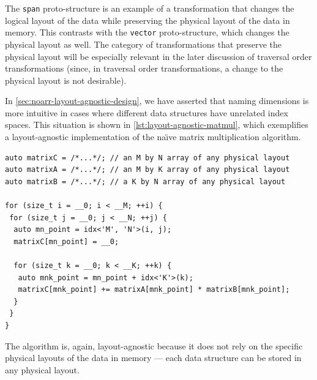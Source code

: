 The \lstinline{span} proto-structure is an example of a transformation that changes the logical layout of the data while preserving the physical layout of the data in memory. This contrasts with the \lstinline{vector} proto-structure, which changes the physical layout as well. The category of transformations that preserve the physical layout will be especially relevant in the later discussion of traversal order transformations (since, in traversal order transformations, a change to the physical layout is not desirable).


In \cref{sec:noarr-layout-agnostic-design}, we have asserted that naming dimensions is more intuitive in cases where different data structures have unrelated index spaces. This situation is shown in \cref{lst:layout-agnostic-matmul}, which exemplifies a layout-agnostic implementation of the na\"{\i}ve matrix multiplication algorithm.


\begin{lstlisting}[style=C++, caption={A layout-agnostic matrix multiplication algorithm using Noarr structures.}, label={lst:layout-agnostic-matmul}]
auto matrixC = /*...*/; // an M by N array of any physical layout
auto matrixA = /*...*/; // an M by K array of any physical layout
auto matrixB = /*...*/; // a K by N array of any physical layout

for (size_t i = __0; i < __M; ++i) {
 for (size_t j = __0; j < __N; ++j) {
  auto mn_point = idx<'M', 'N'>(i, j);
  matrixC[mn_point] = __0;

  for (size_t k = __0; k < __K; ++k) {
   auto mnk_point = mn_point + idx<'K'>(k);
   matrixC[mnk_point] += matrixA[mnk_point] * matrixB[mnk_point];
  }
 }
}
\end{lstlisting}

The algorithm is, again, layout-agnostic because it does not rely on the specific physical layouts of the data in memory --- each data structure can be stored in any physical layout.

